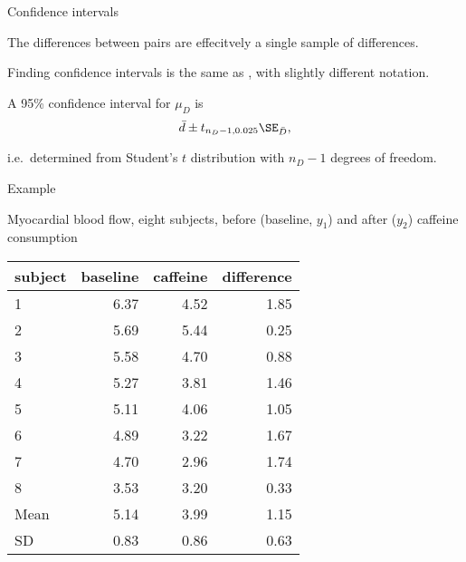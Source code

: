 \begin{frame}{Confidence intervals}

   The differences between pairs are effecitvely a \alert{single sample} of differences.

    \vspace{2em}

    Finding confidence intervals is \alert{the same} as , with slightly different notation.

    \vspace{2em}

    A \alert{95\% confidence interval} for $\mu_D$ is
    \[  \bar d \pm t_{n_D-1,0.025} \SE_{\bar D} ,\]

    \vspace{2em}

    i.e.\ determined from Student's $t$ distribution with $n_D-1$ degrees of freedom.

\end{frame}

\begin{frame}{Example}

  Myocardial blood flow, eight subjects, before (baseline, $y_1$) and after ($y_2$) caffeine consumption
  \begin{center}
    \begin{tabular}{lrrr}
      \hline
      subject & baseline & caffeine & difference \\ 
      \hline
      1 & 6.37 & 4.52 & 1.85 \\ 
      2 & 5.69 & 5.44 & 0.25 \\ 
      3 & 5.58 & 4.70 & 0.88 \\ 
      4 & 5.27 & 3.81 & 1.46 \\ 
      5 & 5.11 & 4.06 & 1.05 \\ 
      6 & 4.89 & 3.22 & 1.67 \\ 
      7 & 4.70 & 2.96 & 1.74 \\ 
      8 & 3.53 & 3.20 & 0.33 \\ 
      \hline
      Mean & 5.14 & 3.99 & 1.15 \\ 
       SD & 0.83 & 0.86 & 0.63 \\ 
     \end{tabular}
  \end{center}

\end{frame}


